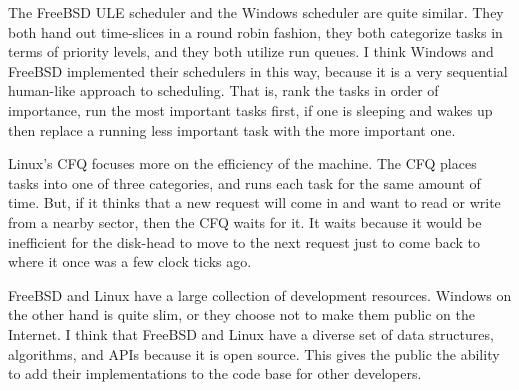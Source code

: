 \documentclass[onecolumn,draftclsnofoot, 10pt, compsoc]{IEEEtran}
\begin{document}
	The FreeBSD ULE scheduler and the Windows scheduler are quite similar.
	They both hand out time-slices in a round robin fashion, they both categorize tasks in terms of priority levels, and they both utilize run queues.
	I think Windows and FreeBSD implemented their schedulers in this way, because it is a very sequential human-like approach to scheduling. That is, rank the tasks in order of importance, run the most important tasks first, if one is sleeping and wakes up then replace a running less important task with the more important one.
	
	Linux's CFQ focuses more on the efficiency of the machine. 
	The CFQ places tasks into one of three categories, and runs each task for the same amount of time.
	But, if it thinks that a new request will come in and want to read or write from a nearby sector, then the CFQ waits for it.
	It waits because it would be inefficient for the disk-head to move to the next request just to come back to where it once was a few clock ticks ago.
	
	FreeBSD and Linux have a large collection of development resources. 
	Windows on the other hand is quite slim, or they choose not to make them public on the Internet.
	I think that FreeBSD and Linux have a diverse set of data structures, algorithms, and APIs because it is open source. This gives the public the ability to add their implementations to the code base for other developers.
	


\end{document}
